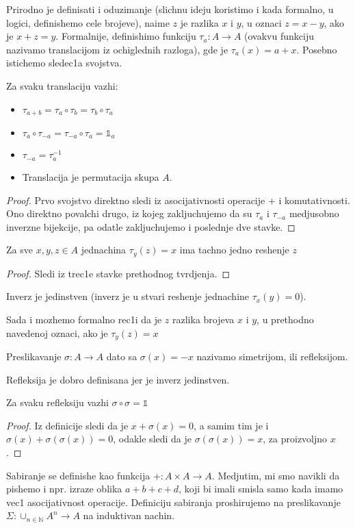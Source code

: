 \documentclass[../main_og.tex]{subfiles}
\begin{document}
    Prirodno je definisati i oduzimanje (slichnu ideju koristimo i kada formalno, u logici, definishemo cele brojeve), naime $z$ je razlika $x$ i $y$, u oznaci $z=x-y$, ako je $x+z=y$. Formalnije, definishimo funkciju $\tau_a : A \to A$ (ovakvu funkciju nazivamo translacijom iz ochiglednih razloga), gde je $\tau_a(x)=a+x$. Posebno istichemo sledec1a svojstva.
    {\tvr Za svaku translaciju vazhi:
        \begin{itemize}
    \item $\tau_{a+b}=\tau_a\circ\tau_b=\tau_b\circ\tau_a$
\item $\tau_a\circ\tau_{-a}=\tau_{-a}\circ\tau_a=\mathds{1}_a$
\item $\tau_{-a}=\tau_a^{-1}$
\item Translacija je permutacija skupa $A$.\end{itemize}}
    \begin{proof}
        Prvo svojstvo direktno sledi iz asocijativnosti operacije $+$ i komutativnosti. Ono direktno povalchi drugo, iz kojeg zakljuchujemo da su $\tau_a$ i $\tau_{-a}$ medjusobno inverzne bijekcije, pa odatle zakljuchujemo i poslednje dve stavke.\end{proof}

    {\tvr Za sve $x,y,z\in A$ jednachina $\tau_y(z)=x$ ima tachno jedno reshenje $z$ }
    \begin{proof}
    Sledi iz trec1e stavke prethodnog tvrdjenja.     \end{proof}

    {\posl Inverz je jedinstven (inverz je u stvari reshenje jednachine $\tau_x(y)=0$).} 

    Sada i mozhemo formalno rec1i da je $z$ razlika brojeva $x$ i $y$, u prethodno navedenoj oznaci, ako je $\tau_{y}(z)=x$

    {\de Preslikavanje $\sigma: A \to A$ dato sa $\sigma(x)=-x$ nazivamo simetrijom, ili refleksijom}.

    \nap Refleksija je dobro definisana jer je inverz jedinstven.

    {\tvr Za svaku refleksiju vazhi $\sigma\circ\sigma=\mathds{1}$}

    \begin{proof} 
    Iz definicije sledi da je $x+\sigma(x)=0$, a samim tim je i $\sigma(x)+\sigma(\sigma(x))=0$, odakle sledi da je $\sigma(\sigma(x))=x$, za proizvoljno $x$.    \end{proof}

    Sabiranje se definishe kao funkcija $+:A \times A \to A$. Medjutim, mi smo navikli da pishemo i npr. izraze oblika $a+b+c+d$, koji bi imali smisla samo kada imamo vec1 asocijativnost operacije. Definiciju sabiranja proshirujemo na preslikavanje $\Sigma : \cup_{n\in \mathbb{N}} A^{n} \to A$ na induktivan nachin.
\end{document}
